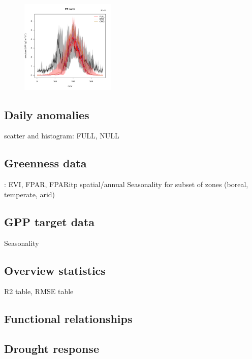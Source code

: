 \documentclass{myreport}
\begin{document}
\begin{figure}[!ht]
\includegraphics[width=0.4\textwidth]{fig/meandoy_byzone_ETnorth_all.pdf}
    \caption{}
    \label{fig:modobs_spatialannual}
\end{figure}



\subsection{Daily anomalies}
scatter and histogram: FULL, NULL

\subsection{Greenness data}
: EVI, FPAR, FPARitp
spatial/annual
Seasonality for subset of zones (boreal, temperate, arid)

\subsection{GPP target data}
Seasonality

\subsection{Overview statistics}
R2 table, RMSE table

\subsection{Functional relationships}


\subsection{Drought response}


\end{document}
